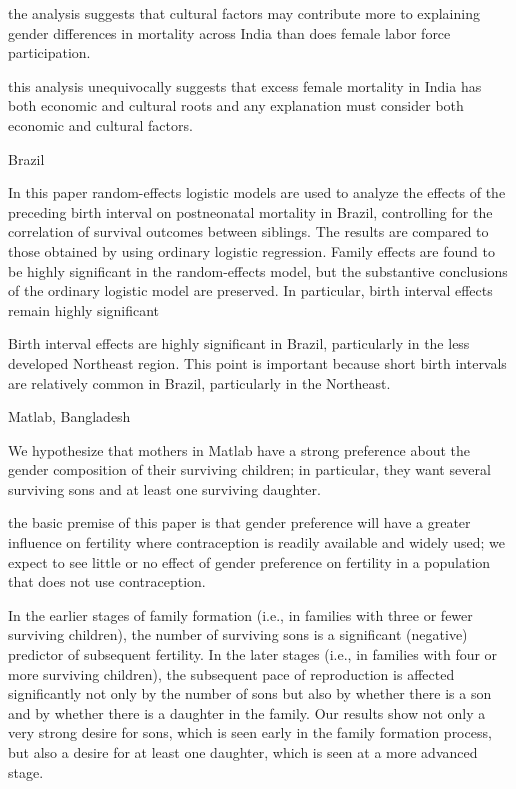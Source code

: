 the analysis suggests that cultural factors may contribute more to
explaining gender
differences in mortality across India than does female labor force
participation.

this analysis unequivocally suggests that excess female mortality in
India has both 
economic and cultural roots and any explanation must consider both
economic and cultural 
factors.

\citep{Curtis1993}

Brazil

In this paper random-effects logistic models are used to analyze the
effects of the
preceding birth interval on postneonatal mortality in Brazil,
controlling for the
correlation of survival outcomes between siblings. The results are
compared to those
obtained by using ordinary logistic regression. Family effects are found
to be highly
significant in the random-effects model, but the substantive conclusions
of the
ordinary logistic model are preserved. In particular, birth interval
effects remain
highly significant

Birth interval effects are highly significant in Brazil, particularly in
the less developed
Northeast region. This point is important because short birth intervals
are relatively common
in Brazil, particularly in the Northeast.


\citep{Rahman1993}

Matlab, Bangladesh

We hypothesize that mothers in Matlab have a strong preference about the
gender composition of their surviving children; in particular, they want
several surviving sons and at least one surviving daughter.

the basic premise of this paper is that gender preference will have a
greater influence on fertility where contraception is readily available
and widely used; we expect to see little or no effect of gender
preference on fertility in a population that does not use contraception.

In the earlier stages of family formation (i.e., in families with three
or fewer surviving children), the number of surviving sons is a
significant (negative) predictor of subsequent fertility. In the later
stages (i.e., in families with four or more surviving children), the
subsequent pace of reproduction is affected significantly not only by
the number of sons but also by whether there is a son and by whether
there is a daughter in the family. Our results show not only a very
strong desire for sons, which is seen early in the family formation
process, but also a desire for at least one daughter, which is seen at a
more advanced stage.

